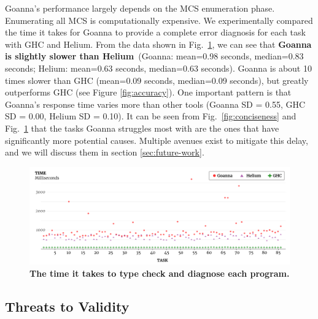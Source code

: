     Goanna's performance largely depends on the MCS enumeration phase. Enumerating all MCS is computationally expensive. We experimentally compared the time it takes for Goanna to provide a complete error diagnosis for each task with GHC and Helium. From the data shown in Fig.~\ref{fig:performance}, we can see that \textbf{Goanna is slightly slower than Helium}~(Goanna: mean=0.98 seconds, median=0.83 seconds; Helium: mean=0.63 seconds, median=0.63 seconds). Goanna is about 10 times slower than GHC (mean=0.09 seconds, median=0.09 seconds), but greatly outperforms GHC (see Figure \ref{fig:accuracy}). One important pattern is that Goanna's response time varies more than other tools (Goanna SD = 0.55, GHC SD = 0.00, Helium SD = 0.10). It can be seen from Fig.~\ref{fig:conciseness} and Fig.~\ref{fig:performance} that the tasks Goanna struggles most with are the ones that have significantly more potential causes. Multiple avenues exist to mitigate this delay, and we will discuss them in section \ref{sec:future-work}.
    
    \begin{figure}[htb!]
        \centering
        \includegraphics[width=\linewidth]{images/Performance}
        \caption{\textbf{The time it takes to type check and diagnose each program.} }
        \label{fig:performance}
    \end{figure}

	
	



    \subsection{Threats to Validity}

